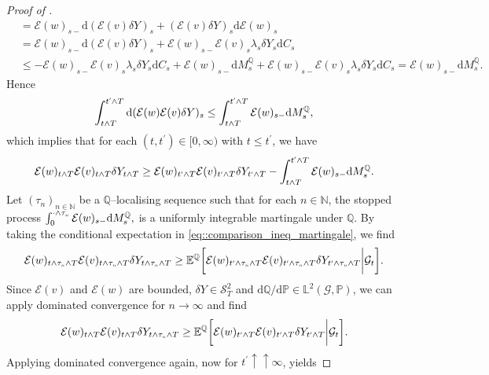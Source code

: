 \documentclass[10pt]{article} %
\newcommand\cE{\mathcal E}
\newcommand\cG{\mathcal G}
\newcommand\cS{\mathcal S}
\newcommand{\smalltext}[1]{\text{\fontsize{4}{4}\selectfont$#1$}}
\def \E{\mathbb{E}}
\def \L{\mathbb{L}}
\def \N{\mathbb{N}}
\def \P{\mathbb{P}}
\def \Q{\mathbb{Q}}
\newcommand{\1}{\mathbf{1}}
\def\d{\mathrm{d}}
\begin{document}
\begin{proof}[Proof of ]
\begin{align*}
		&= \cE(w)_{s-}\d (\cE(v)\delta Y)_s + (\cE(v)\delta Y)_s\d \cE(w)_s \\
		&= \cE(w)_{s-}\d (\cE(v)\delta Y)_s + \cE(w)_{s-}\cE(v)_s \lambda_s \delta Y_s\d C_s \\
		&\leq -\cE(w)_{s-}\cE(v)_s\lambda_s\delta Y_s \d C_s + \cE(w)_{s-}\d M^\Q_s + \cE(w)_{s-}\cE(v)_s \lambda_s \delta Y_s\d C_s = \cE(w)_{s-}\d M^\Q_s.
	\end{align*}
	Hence
	\begin{equation*}
		\int_{t \land T}^{t^\smalltext{\prime} \land T} \d (\cE(w)\cE(v)\delta Y)_s \leq \int_{t \land T}^{t^\smalltext{\prime} \land T}\cE(w)_{s-}\d M^\Q_s,
	\end{equation*}
	which implies that for each $(t,t^\prime) \in [0,\infty)$ with $t \leq t^\prime$, we have
	\begin{equation}\label{eq::comparison_ineq_martingale}
		\cE(w)_{t \land T}\cE(v)_{t \land T}\delta Y_{t \land T} \geq \cE(w)_{t^\smalltext{\prime} \land T}\cE(v)_{t^\smalltext{\prime} \land T}\delta Y_{t^\smalltext{\prime} \land T} - \int_{t \land T}^{t^\smalltext{\prime} \land T}\cE(w)_{s-}\d M^\Q_s.
	\end{equation}
	Let $(\tau_n)_{n \in \N}$ be a $\Q$--localising sequence such that for each $n \in \N$, the stopped process $\int_0^{\cdot \land \tau_\smalltext{n}} \cE(w)_{s-} \d M^\Q_s,$ is a uniformly integrable martingale under $\Q$. By taking the conditional expectation in \eqref{eq::comparison_ineq_martingale}, we find
	\begin{equation}\label{eq::comp_limit_n}
		\cE(w)_{t \land \tau_\smalltext{n} \land T}\cE(v)_{t \land \tau_\smalltext{n} \land T}\delta Y_{t \land \tau_\smalltext{n} \land T} \geq \E^\Q\bigg[ \cE(w)_{t^\smalltext{\prime} \land \tau_\smalltext{n} \land T}\cE(v)_{t^\smalltext{\prime} \land \tau_\smalltext{n} \land T}\delta Y_{t^\smalltext{\prime} \land \tau_\smalltext{n} \land T} \bigg| \cG_t\bigg].
	\end{equation}
	Since $\cE(v)$ and $\cE(w)$ are bounded, $\delta Y \in \cS^2_T$ and $\d\Q/\d\P \in \L^2(\cG,\P)$, we can apply dominated convergence for $n \longrightarrow \infty$ and find
	\begin{equation}\label{eq::comp_limit_t}
		\cE(w)_{t \land T}\cE(v)_{t \land T}\delta Y_{t \land \tau_\smalltext{n} \land T} \geq \E^\Q\bigg[ \cE(w)_{t^\smalltext{\prime} \land T}\cE(v)_{t^\smalltext{\prime} \land T}\delta Y_{t^\smalltext{\prime} \land T} \bigg| \cG_t\bigg].
	\end{equation}
	Applying dominated convergence again, now for $t^\prime \uparrow\uparrow \infty$, yields

\end{proof}
\end{document}
